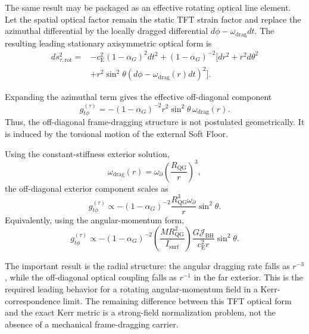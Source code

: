 The same result may be packaged as an effective rotating optical line element. Let the spatial optical factor remain the static TFT strain factor and replace the azimuthal differential by the locally dragged differential \(d\phi-\omega_{\mathrm{drag}}dt\). The resulting leading stationary axisymmetric optical form is
\begin{equation}
\begin{aligned}
    ds_{\tau,\mathrm{rot}}^2
    ={}&
    -c_{\mathrm{E}}^2
    \left(1-\alpha_G\right)^2dt^2
    +
    \left(1-\alpha_G\right)^{-2}
    \Big[
    dr^2
    +
    r^2d\theta^2
    \\
    &
    +
    r^2\sin^2\theta
    \left(
    d\phi
    -
    \omega_{\mathrm{drag}}(r)dt
    \right)^2
    \Big].
\end{aligned}
\end{equation}

Expanding the azimuthal term gives the effective off-diagonal component
\begin{equation}
    g_{t\phi}^{(\tau)}
    =
    -
    \left(1-\alpha_G\right)^{-2}
    r^2\sin^2\theta\,
    \omega_{\mathrm{drag}}(r).
\end{equation}
Thus, the off-diagonal frame-dragging structure is not postulated geometrically. It is induced by the torsional motion of the external Soft Floor.

Using the constant-stiffness exterior solution,
\begin{equation}
    \omega_{\mathrm{drag}}(r)
    =
    \omega_{\partial}
    \left(
    \frac{R_{\mathrm{QG}}}{r}
    \right)^3,
\end{equation}
the off-diagonal exterior component scales as
\begin{equation}
    g_{t\phi}^{(\tau)}
    \propto
    -
    \left(1-\alpha_G\right)^{-2}
    \frac{R_{\mathrm{QG}}^3\omega_{\partial}}{r}
    \sin^2\theta .
\end{equation}
Equivalently, using the angular-momentum form,
\begin{equation}
    g_{t\phi}^{(\tau)}
    \propto
    -
    \left(1-\alpha_G\right)^{-2}
    \left(
    \frac{M R_{\mathrm{QG}}^2}{I_{\mathrm{surf}}}
    \right)
    \frac{G\mathcal{J}_{\mathrm{BH}}}{c_{\mathrm{E}}^2 r}
    \sin^2\theta .
\end{equation}

The important result is the radial structure: the angular dragging rate falls as \(r^{-3}\), while the off-diagonal optical coupling falls as \(r^{-1}\) in the far exterior. This is the required leading behavior for a rotating angular-momentum field in a Kerr-correspondence limit. The remaining difference between this TFT optical form and the exact Kerr metric is a strong-field normalization problem, not the absence of a mechanical frame-dragging carrier.

